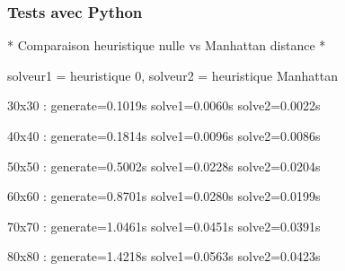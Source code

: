 \documentclass[]{beamer}
\begin{document}
\begin{frame}
  \frametitle{Tests avec Python}
  \begin{semiverbatim}
    * Comparaison heuristique nulle vs Manhattan distance *
    
    solveur1 = heuristique 0, solveur2 = heuristique Manhattan
    
    30x30  : generate=0.1019s solve1=0.0060s solve2=0.0022s
    
    40x40  : generate=0.1814s solve1=0.0096s solve2=0.0086s
    
    50x50  : generate=0.5002s solve1=0.0228s solve2=0.0204s
    
    60x60  : generate=0.8701s solve1=0.0280s solve2=0.0199s
    
    70x70  : generate=1.0461s solve1=0.0451s solve2=0.0391s
    
    80x80  : generate=1.4218s solve1=0.0563s solve2=0.0423s
  \end{semiverbatim}
\end{frame}
\end{document}
